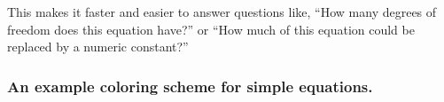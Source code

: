 \documentclass[12pt,letterpaper]{article}
\begin{document}

This makes it faster and easier to answer questions like,
``How many degrees of freedom does this equation have?''
or
``How much of this equation could be replaced by a numeric constant?''

\subsubsection{An example coloring scheme for simple equations.}

\boldmath


\newcommand{\op}{\textcolor{Plum}} %
\newcommand{\fv}{\textcolor{DarkGreen}} %
\newcommand{\iv}{\textcolor{red}} %
\newcommand{\fc}{\textcolor{blue}} %
\newcommand{\bv}{\textcolor{Gray}} %
\newcommand{\nt}{\textcolor{black}} %


\end{document}
